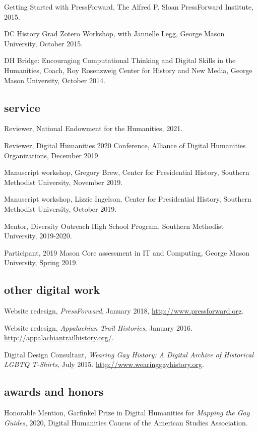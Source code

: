 \documentclass[11pt]{article}
\begin{document}
Getting Started with PressForward, The Alfred P. Sloan PressForward Institute, 2015.

DC History Grad Zotero Workshop, with Jannelle Legg, George Mason University, October 2015.

DH Bridge: Encouraging Computational Thinking and Digital Skills in the Humanities, Coach, Roy Rosenzweig Center for History and New Media, George Mason University, October 2014.

\subsection{service}\label{service}
Reviewer, National Endowment for the Humanities, 2021.

Reviewer, Digital Humanities 2020 Conference, Alliance of Digital Humanities Organizations, December 2019.

Manuscript workshop, Gregory Brew, Center for Presidential History, Southern Methodist University, November 2019.

Manuscript workshop, Lizzie Ingelson, Center for Presidential History, Southern Methodist University, October 2019.

Mentor, Diversity Outreach High School Program, Southern Methodist University, 2019-2020.

Participant, 2019 Mason Core assessment in IT and Computing, George Mason University, Spring 2019.

\subsection{other digital work}\label{other-digital-work}

Website redesign, \emph{PressForward}, January 2018, \url{http://www.pressforward.org}.

Website redesign, \emph{Appalachian Trail Histories}, January 2016. \url{http://appalachiantrailhistory.org/}.

Digital Design Consultant, \emph{Wearing Gay History: A Digital Archive of Historical LGBTQ T-Shirts}, July 2015. \url{http://www.wearinggayhistory.org}.

\subsection{awards and honors}
Honorable Mention, Garfinkel Prize in Digital Humanities for \emph{Mapping the Gay Guides}, 2020, Digital Humanities Caucus of the American Studies Association.
\end{document}
